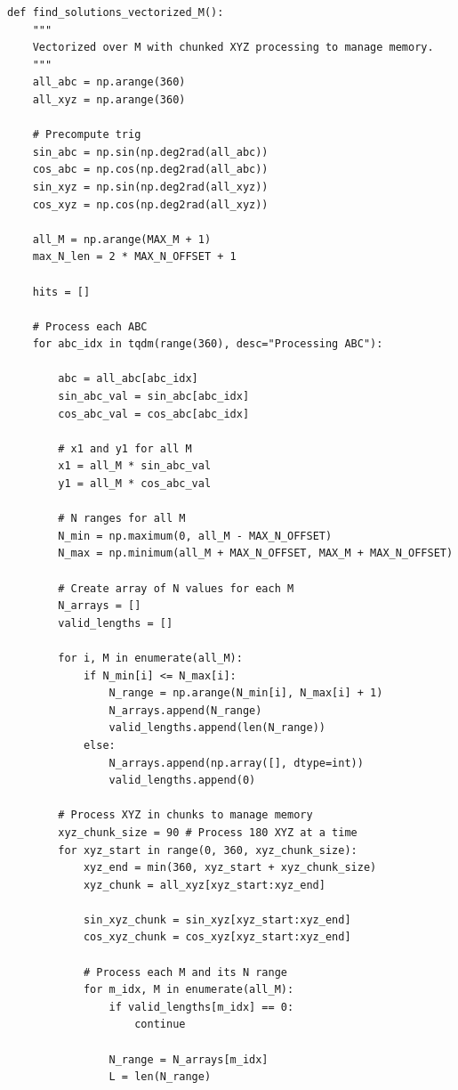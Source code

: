 \documentclass{article}
\begin{document}
\begin{enumerate}
\begin{verbatim}
def find_solutions_vectorized_M():
    """
    Vectorized over M with chunked XYZ processing to manage memory.
    """
    all_abc = np.arange(360)
    all_xyz = np.arange(360)
    
    # Precompute trig
    sin_abc = np.sin(np.deg2rad(all_abc))
    cos_abc = np.cos(np.deg2rad(all_abc))
    sin_xyz = np.sin(np.deg2rad(all_xyz))
    cos_xyz = np.cos(np.deg2rad(all_xyz))
    
    all_M = np.arange(MAX_M + 1)
    max_N_len = 2 * MAX_N_OFFSET + 1
    
    hits = []
    
    # Process each ABC
    for abc_idx in tqdm(range(360), desc="Processing ABC"):

        abc = all_abc[abc_idx]
        sin_abc_val = sin_abc[abc_idx]
        cos_abc_val = cos_abc[abc_idx]
        
        # x1 and y1 for all M
        x1 = all_M * sin_abc_val
        y1 = all_M * cos_abc_val
        
        # N ranges for all M
        N_min = np.maximum(0, all_M - MAX_N_OFFSET)
        N_max = np.minimum(all_M + MAX_N_OFFSET, MAX_M + MAX_N_OFFSET)
        
        # Create array of N values for each M
        N_arrays = []
        valid_lengths = []
        
        for i, M in enumerate(all_M):
            if N_min[i] <= N_max[i]:
                N_range = np.arange(N_min[i], N_max[i] + 1)
                N_arrays.append(N_range)
                valid_lengths.append(len(N_range))
            else:
                N_arrays.append(np.array([], dtype=int))
                valid_lengths.append(0)
        
        # Process XYZ in chunks to manage memory
        xyz_chunk_size = 90 # Process 180 XYZ at a time
        for xyz_start in range(0, 360, xyz_chunk_size):
            xyz_end = min(360, xyz_start + xyz_chunk_size)
            xyz_chunk = all_xyz[xyz_start:xyz_end]
            
            sin_xyz_chunk = sin_xyz[xyz_start:xyz_end]
            cos_xyz_chunk = cos_xyz[xyz_start:xyz_end]
            
            # Process each M and its N range
            for m_idx, M in enumerate(all_M):
                if valid_lengths[m_idx] == 0:
                    continue
                    
                N_range = N_arrays[m_idx]
                L = len(N_range)
                

\end{verbatim}
\end{enumerate}
\end{document}
